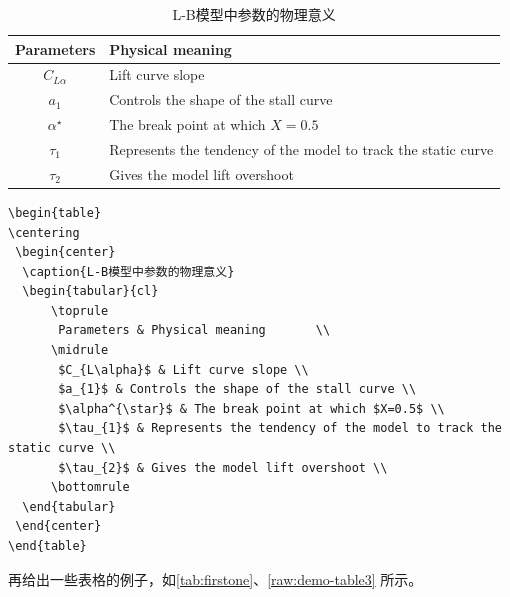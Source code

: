 \begin{table}              %
\centering
 \begin{center}
  \caption{L-B模型中参数的物理意义}
  \label{tab:LB-parameters}
  \begin{tabular}{cl}
      \toprule
       Parameters & Physical meaning       \\
      \midrule
       $C_{L\alpha}$ & Lift curve slope \\
       $a_{1}$ & Controls the shape of the stall curve \\
       $\alpha^{\star}$ & The break point at which $X=0.5$ \\
       $\tau_{1}$ & Represents the tendency of the model to track the static curve \\
       $\tau_{2}$ & Gives the model lift overshoot \\
      \bottomrule
  \end{tabular}
 \end{center}
\end{table}

\begin{lstlisting}[language={[LaTeX]TeX}, caption={插入\cref{tab:LB-parameters}}, label=raw:demo-table2]
\begin{table}
\centering
 \begin{center}
  \caption{L-B模型中参数的物理意义}
  \begin{tabular}{cl}
      \toprule
       Parameters & Physical meaning       \\
      \midrule
       $C_{L\alpha}$ & Lift curve slope \\
       $a_{1}$ & Controls the shape of the stall curve \\
       $\alpha^{\star}$ & The break point at which $X=0.5$ \\
       $\tau_{1}$ & Represents the tendency of the model to track the static curve \\
       $\tau_{2}$ & Gives the model lift overshoot \\
      \bottomrule
  \end{tabular}
 \end{center}
\end{table}
\end{lstlisting}

再给出一些表格的例子，如\cref{tab:firstone}、\cref{raw:demo-table3} 所示。

